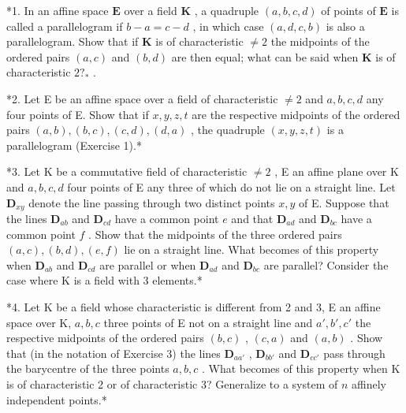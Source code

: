 \BourbakiExercisesSection

*1. In an affine space \(\mathbf{E}\) over a field \(\mathbf{K}\) , a quadruple \((a, b, c, d)\) of points of \(\mathbf{E}\) is called a parallelogram if \(b - a = c - d\) , in which case \((a, d, c, b)\) is also a parallelogram. Show that if \(\mathbf{K}\) is of characteristic \(\neq 2\) the midpoints of the ordered pairs \((a, c)\) and \((b, d)\) are then equal; what can be said when \(\mathbf{K}\) is of characteristic \(2?_{*}\) .

*2. Let E be an affine space over a field of characteristic \(\neq 2\) and \(a, b, c, d\) any four points of E. Show that if \(x, y, z, t\) are the respective midpoints of the ordered pairs \((a, b), (b, c), (c, d), (d, a)\) , the quadruple \((x, y, z, t)\) is a parallelogram (Exercise 1).*

*3. Let K be a commutative field of characteristic \(\neq 2\) , E an affine plane over K and \(a, b, c, d\) four points of E any three of which do not lie on a straight line. Let \(\mathbf{D}_{xy}\) denote the line passing through two distinct points \(x, y\) of E. Suppose that the lines \(\mathbf{D}_{ab}\) and \(\mathbf{D}_{cd}\) have a common point \(e\) and that \(\mathbf{D}_{ad}\) and \(\mathbf{D}_{bc}\) have a common point \(f\) . Show that the midpoints of the three ordered pairs \((a, c), (b, d), (e, f)\) lie on a straight line. What becomes of this property when \(\mathbf{D}_{ab}\) and \(\mathbf{D}_{cd}\) are parallel or when \(\mathbf{D}_{ad}\) and \(\mathbf{D}_{bc}\) are parallel? Consider the case where K is a field with 3 elements.*

*4. Let K be a field whose characteristic is different from 2 and 3, E an affine space over K, \(a, b, c\) three points of E not on a straight line and \(a', b', c'\) the respective midpoints of the ordered pairs \((b, c)\) , \((c, a)\) and \((a, b)\) . Show that (in the notation of Exercise 3) the lines \(\mathbf{D}_{aa'}\) , \(\mathbf{D}_{bb'}\) and \(\mathbf{D}_{cc'}\) pass through the barycentre of the three points \(a, b, c\) . What becomes of this property when K is of characteristic 2 or of characteristic 3? Generalize to a system of \(n\) affinely independent points.*

